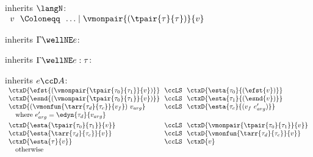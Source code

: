 \begin{flushleft}

 inherits $\langN$:\\
$\begin{array}{l@{~~}c@{~~}l}
  v & \Coloneqq & \ldots \mid \vmonpair{(\tpair{\tau}{\tau})}{v}
\end{array}$

\medskip
\begin{minipage}[t]{\columnwidth}
 inherits $\Gamma \wellNE e$:
\begin{mathpar}
\end{mathpar}
\end{minipage}%
\begin{minipage}[t]{\columnwidth}
 inherits $\Gamma \wellNE e : \tau$:
\begin{mathpar}
\end{mathpar}
\end{minipage}


\medskip
\begin{minipage}[t]{\columnwidth}
 inherits $e \ccD A$:\\
$\begin{array}{l@{~~}c@{~~}l}
  \ctxD{\efst{(\vmonpair{\tpair{\tau_0}{\tau_1}}{v})}} & \ccLS & \ctxD{\esta{\tau_0}{(\efst{v})}}
\\
  \ctxD{\esnd{(\vmonpair{\tpair{\tau_0}{\tau_1}}{v})}} & \ccLS & \ctxD{\esta{\tau_1}{(\esnd{v})}}
\\
  \ctxD{(\vmonfun{\tarr{\tau_d}{\tau_c}}{v_f})~v_{arg}} & \ccLS & \ctxD{\esta{\tau_c}{(v_f~e_{arg}')}}
\\ \multicolumn{3}{l}{\mbox{\quad where $e_{arg}' = \edyn{\tau_d}{v_{arg}}$}}
\\[0.8ex]
  \ctxD{\esta{\tpair{\tau_0}{\tau_1}}{v}} & \ccLS & \ctxD{\vmonpair{\tpair{\tau_0}{\tau_1}}{v}}
\\
  \ctxD{\esta{\tarr{\tau_d}{\tau_c}}{v}} & \ccLS & \ctxD{\vmonfun{\tarr{\tau_d}{\tau_c}}{v}}
\\
  \ctxD{\esta{\tau}{v}} & \ccLS & \ctxD{v}
\\ \multicolumn{3}{l}{\mbox{\quad otherwise}}
\end{array}$


\end{minipage}
\end{flushleft}
